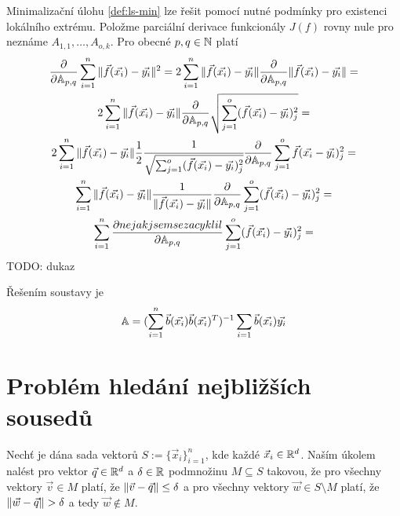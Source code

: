 Minimalizační úlohu \ref{def:ls-min} lze řešit pomocí nutné podmínky pro existenci lokálního extrému. Položme parciální derivace funkcionály $J(f)$ rovny nule pro neznáme $A_{1,1}, \ldots, A_{o,k}$. Pro obecné $p, q \in \mathbb{N}$ platí
\begin{multline}
  \frac{\partial}{\partial\mathbb{A}_{p,q}} \sum_{i = 1}^n \|\vec{f}(\vec{x_i}) - \vec{y_i}\|^2 = 
  2\sum_{i = 1}^n \|\vec{f}(\vec{x_i}) - \vec{y_i}\| \frac{\partial}{\partial\mathbb{A}_{p,q}}\|\vec{f}(\vec{x_i}) - \vec{y_i}\| = \\
  2\sum_{i = 1}^n \|\vec{f}(\vec{x_i}) - \vec{y_i}\| \frac{\partial}{\partial\mathbb{A}_{p,q}} \sqrt{\sum_{j = 1}^o (\vec{f}(\vec{x_i})-\vec{y_i})^2_j} = \\
  2\sum_{i = 1}^n \|\vec{f}(\vec{x_i}) - \vec{y_i}\| \frac{1}{2}\cfrac{1}{\sqrt{\sum_{j = 1}^o (\vec{f}(\vec{x_i})-\vec{y_i})^2_j}} \frac{\partial}{\partial\mathbb{A}_{p,q}} \sum_{j = 1}^o \vec{f}(\vec{x_i} - \vec{y_i})_j^2 = \\
  \sum_{i = 1}^n \|\vec{f}(\vec{x_i})-\vec{y_i}\| \frac{1}{\|\vec{f}(\vec{x_i}) - \vec{y_i}\|} \frac{\partial}{\partial\mathbb{A}_{p,q}} \sum_{j = 1}^o(\vec{f}(\vec{x_i}) - \vec{y_i})_j^2 =\\
  \sum_{i = 1}^n \frac{\partial nejak jsem se zacyklil}{\partial\mathbb{A}_{p,q}} \sum_{j = 1}^o(\vec{f}(\vec{x_i}) - \vec{y_i})_j^2 = \\
\end{multline}
TODO: dukaz

Řešením soustavy je
\begin{equation}
  \mathbb{A} = (\sum_{i = 1}^n \vec{b}(\vec{x_i})\vec{b}(\vec{x_i})^T)^{-1} \sum_{i = 1} \vec{b}(\vec{x_i})\vec{y_i}
\end{equation}

\section{Problém hledání nejbližších sousedů}

\label{defi:nns}
\begin{defi}
  Nechť je dána sada vektorů $S := \{\vec{x}_i\}_{i = 1}^n$, kde každé $\vec{x}_i \in \mathbb{R}^d$. Naším úkolem nalést pro vektor $\vec{q} \in \mathbb{R}^d$ a $\delta \in \mathbb{R}$ podmnožinu $M \subseteq S$ takovou, že pro všechny vektory $\vec{v} \in M$ platí, že $\|\vec{v} - \vec{q}\| \leq \delta$ a pro všechny vektory $\vec{w} \in S \setminus M$ platí, že $\|\vec{w} - \vec{q}\| > \delta$ a tedy $\vec{w} \not\in M$.
\end{defi}

